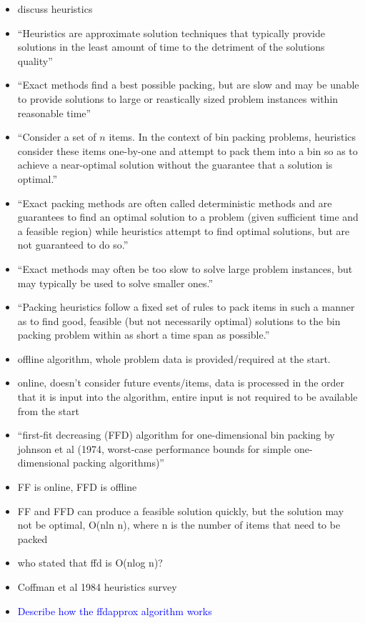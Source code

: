 \documentclass[oribibl]{llncs}
\begin{document}
\begin{itemize}
	\item discuss heuristics
	\item ``Heuristics are approximate solution techniques that typically provide solutions in the least amount of time to the detriment of the solutions quality''
	\item ``Exact methods find a best possible packing, but are slow and may be unable to provide solutions to large or reastically sized problem instances within reasonable time''
	\item ``Consider a set of $n$ items. In the context of bin packing problems, heuristics consider these items one-by-one and attempt to pack them into a bin so as to achieve a near-optimal solution without the guarantee that a solution is optimal.''
	\item ``Exact packing methods are often called deterministic methods and are guarantees to find an optimal solution to a problem (given sufficient time and a feasible region) while heuristics attempt to find optimal solutions, but are not guaranteed to do so.''
	\item ``Exact methods may often be too slow to solve large problem instances, but may typically be used to solve smaller ones.''
	\item ``Packing heuristics follow a fixed set of rules to pack items in such a manner as to find good, feasible (but not necessarily optimal) solutions to the bin packing problem within as short a time span as possible.''
	\item offline algorithm, whole problem data is provided/required at the start.
	\item online, doesn't consider future events/items, data is processed in the order that it is input into the algorithm, entire input is not required to be available from the start
	\item ``first-fit decreasing (FFD) algorithm for one-dimensional bin packing by johnson et al (1974, worst-case performance bounds for simple one-dimensional packing algorithms)''
	\item FF is online, FFD is offline
	\item FF and FFD can produce a feasible solution quickly, but the solution may not be optimal, O(nln n), where n is the number of items that need to be packed
	\item who stated that ffd is O(nlog n)?
	\item Coffman et al 1984 heuristics survey
	\item \textcolor{blue}{Describe how the ffdapprox algorithm works}

\end{itemize}
\end{document}
